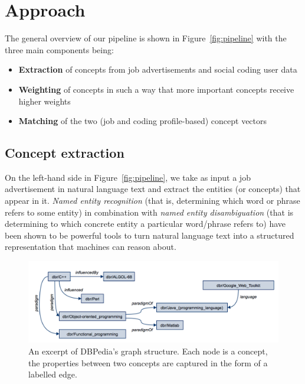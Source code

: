 \documentclass[conference]{IEEEtran}
\begin{document}

\section{Approach}

The general overview of our pipeline is shown in Figure~\ref{fig:pipeline} with
the three main components being:

\begin{itemize}

  \item \textbf{Extraction} of concepts from job advertisements and social
    coding user data

  \item \textbf{Weighting} of concepts in such a way that more important
    concepts receive higher weights

  \item \textbf{Matching} of the two (job and coding profile-based) concept
    vectors

\end{itemize}

\subsection{Concept extraction}

On the left-hand side in Figure~\ref{fig:pipeline}, we take as input a job
advertisement in natural language text and extract the entities (or concepts)
that appear in it. \emph{Named entity recognition} (that is, determining which
word or phrase refers to some entity) in combination with \emph{named entity
disambiguation} (that is determining to which concrete entity a particular
word/phrase refers to) have been shown to be powerful tools to turn natural
language text into a structured representation that machines can reason about.

\begin{figure}[!htb]
\centering
\includegraphics[scale=0.4]{../figs/dbpedia-example-graph.png}
\caption{An excerpt of DBPedia's graph structure. Each node is a concept, the properties between two concepts are captured in the form of a labelled edge.}
\label{fig:dbpedia-example}
\end{figure}
\end{document}
